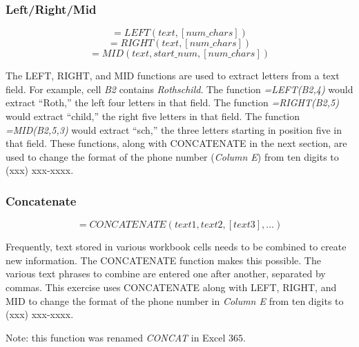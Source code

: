 \subsubsection{Left/Right/Mid}

\[ =LEFT(text, [num\_chars]) \]
\[ =RIGHT(text, [num\_chars]) \]
\[ =MID(text, start\_num, [num\_chars]) \]

The LEFT, RIGHT, and MID functions are used to extract letters from a text field. For example, cell \textit{B2} contains \textit{Rothschild}. The function \textit{=LEFT(B2,4)} would extract ``Roth,'' the left four letters in that field. The function \textit{=RIGHT(B2,5)} would extract ``child,'' the right five letters in that field. The function \textit{=MID(B2,5,3)} would extract ``sch,'' the three letters starting in position five in that field. These functions, along with CONCATENATE in the next section, are used to change the format of the phone number (\textit{Column E}) from ten digits to (xxx) xxx-xxxx.

\subsubsection{Concatenate}

\[ =CONCATENATE(text1, text2, [text3], ...) \]

Frequently, text stored in various workbook cells needs to be combined to create new information. The CONCATENATE function makes this possible. The various text phrases to combine are entered one after another, separated by commas. This exercise uses CONCATENATE along with LEFT, RIGHT, and MID to change the format of the phone number in \textit{Column E} from ten digits to (xxx) xxx-xxxx.

 Note: this function was renamed \textit{CONCAT} in Excel $ 365 $.

